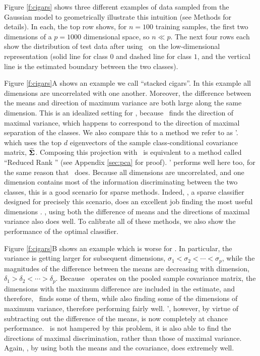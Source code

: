 \documentclass[10pt]{article}
\begin{document}
Figure \ref{f:cigars} shows three different examples of data sampled from the Gaussian model to geometrically illustrate this intuition (see Methods for details).
In each, the top row shows, for  $n=100$ training samples,  the first two dimensions  of a $p=1000$ dimensional space, so $n \ll p$.  
The next four rows each show the distribution of test data after using \Lda~on the low-dimensional representation (solid line for class $0$ and dashed line for class $1$, and the vertical line is the estimated boundary between the two classes). 

Figure \ref{f:cigars}{\color{magenta}A} shows an example we call  ``stacked cigars''.
In this example  all  dimensions are uncorrelated with one another.
Moreover, the difference between the means and direction of maximum variance are both large along the same dimension.
This is an idealized setting for \Pca, because \Pca~finds the direction of maximal variance, which happens to correspond to the direction of maximal separation of the classes.
We also compare this to a method we refer to as \Pca'. which uses the top $d$ eigenvectors of the sample class-conditional covariance matrix, $\widetilde{\boldsymbol{\Sigma}}$. 
Composing this projection with \Lda~is equivalent to a method called ``Reduced Rank \Lda'' \cite{Hastie1996} (see Appendix \ref{sec:pca} for proof). 
\Pca' performs well here too, for the same reason that \Pca~does.
Because all dimensions are uncorrelated, and one dimension contains most of the information discriminating between the two classes, this is a good scenario for sparse methods.
Indeed,  \Road, a sparse classifier designed for precisely this scenario,  does an excellent job finding the most useful dimensions \cite{Fan2012a}.
\Lol, using both the difference of means and the directions of maximal variance also does well.  
To calibrate all of these methods, we also show the performance of the optimal classifier.


Figure \ref{f:cigars}{\color{magenta}B} shows an example which is worse for  \Pca.
In particular, the variance is getting larger for subsequent dimensions, $\sigma_1 < \sigma_2 < \cdots < \sigma_p$, while the magnitudes of the difference between the means are decreasing with dimension, $\delta_1 > \delta_2 < \cdots > \delta_p$.
Because \Pca~operates on the pooled sample covariance matrix, the dimensions with the maximum difference are included in the estimate, and therefore, \Pca~finds some of them, while also finding some of the dimensions of maximum variance, therefore performing fairly well.
\Pca', however, by virtue of subtracting out the difference of the means, is now completely at chance performance.
\Road~is not hampered by this problem, it is also able to find the directions of maximal discrimination, rather than those of maximal variance.
Again, \Lol, by using both the means and the covariance, does extremely well.
\end{document}
